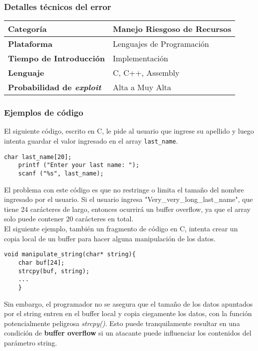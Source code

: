 \subsubsection{Detalles técnicos del error}
\begin{tabular}[\baselineskip]{|l|p{7cm}|}
  \hline
  \textbf{Categoría} & Manejo Riesgoso de Recursos \\
  \hline
  \textbf{Plataforma} & Lenguajes de Programación \\
  \hline
  \textbf{Tiempo de Introducción} & Implementación \\
  \hline
  \textbf{Lenguaje} & C, C++, Assembly \\
  \hline
  \textbf{Probabilidad de \emph{exploit}} & Alta a Muy Alta \\
  \hline
\end{tabular} 

\subsubsection{Ejemplos de código}

El siguiente código, escrito en C, le pide al usuario que ingrese su apellido y luego intenta guardar el valor ingresado en el array \texttt{last\_name}.

\begin{lstlisting}[frame=single]
    char last_name[20];
    printf ("Enter your last name: ");
    scanf ("%s", last_name);
\end{lstlisting}

El problema con este código es que no restringe o limita el tamaño del nombre ingresado por el usuario. Si el usuario ingresa "Very\_very\_long\_last\_name", que tiene 24 carácteres de largo,
entonces ocurrirá un buffer overflow, ya que el array solo puede contener 20 carácteres en total. \\

El siguiente ejemplo, también un fragmento de código en C, intenta crear un copia local de un buffer para hacer alguna manipulación de los datos.

\begin{lstlisting}[frame=single]
    void manipulate_string(char* string){
    char buf[24];
    strcpy(buf, string);
    ...
    }
\end{lstlisting}

Sin embargo, el programador no se asegura que el tamaño de los datos apuntados por el string entren en el buffer local y copia ciegamente los datos, con la 
función potencialmente peligrosa \textit{strcpy()}. Esto puede tranquilamente resultar en una condición de \textbf{buffer overflow}
si un atacante puede influenciar los contenidos del parámetro string. \\

